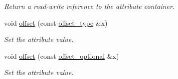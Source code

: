 \begin{DoxyCompactItemize}
\begin{DoxyCompactList}\small\item\em Return a read-\/write reference to the attribute container. \end{DoxyCompactList}\item 
void \hyperlink{classDataArray__t_ac133def4ed8ae6c623d0144f036a18d7}{offset} (const \hyperlink{classDataArray__t_a7b840c5f08bd2c65cd3c5e24ad132cfb}{offset\+\_\+type} \&x)
\begin{DoxyCompactList}\small\item\em Set the attribute value. \end{DoxyCompactList}\item 
void \hyperlink{classDataArray__t_a5abb95d7ab6fb95015c06de57a6ccbc9}{offset} (const \hyperlink{classDataArray__t_a4bc33060e7c386b658c752347ac5f03e}{offset\+\_\+optional} \&x)
\begin{DoxyCompactList}\small\item\em Set the attribute value. \end{DoxyCompactList}\end{DoxyCompactItemize}
